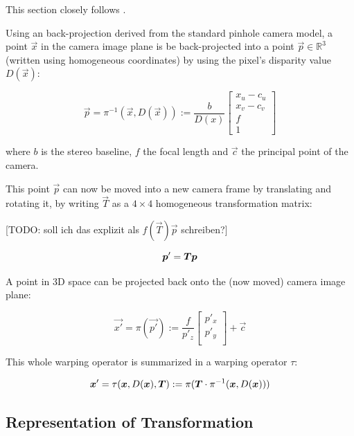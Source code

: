 This section closely follows \cite{omaridenseodometry}.

Using an back-projection derived from the standard pinhole camera model, a
point $ \vec{x} $ in the camera image plane is be back-projected into a point $
\vec{p} \in \mathbb{R}^3 $ (written using homogeneous coordinates) by using the
pixel's disparity value $D(\vec{x})$:

\begin{equation}
    \label{eq:backprojection}
    \vec{p} = \pi^{-1}(\vec{x}, D(\vec{x})) := \frac{b}{D(x)}
    \begin{bmatrix}
        x_u - c_u \\
        x_v - c_v \\
        f \\
        1
    \end{bmatrix}
\end{equation}

where $b$ is the stereo baseline, $f$ the focal length and $\vec{c}$ the principal point of the camera.

This point $\vec{p}$ can now be moved into a new camera frame by translating
and rotating it, by writing $\vec{T}$ as a $4 \times 4$ homogeneous
transformation matrix:

[TODO: soll ich das explizit als $f(\vec{T})\vec{p}$ schreiben?]

\begin{equation}
    \vec{p'} = \mat{T} \vec{p}
\end{equation}

A point in 3D space can be projected back onto the (now moved) camera image plane:

\begin{equation}
    \label{eq:projection}
    \vec{x'} = \pi(\vec{p'}) := \frac{f}{p'_z}
    \begin{bmatrix}
        p'_x \\
        p'_y \\
    \end{bmatrix}
    + \vec{c}
\end{equation}

This whole warping operator is summarized in a warping operator $\tau$:

\begin{equation}
    \vec{x'} = \tau(\vec{x}, D(\vec{x}), \vec{T}) := \pi( \mat{T} \cdot \pi^{-1} (\vec{x}, D(\vec{x})))
\end{equation}


\subsection{Representation of Transformation}

